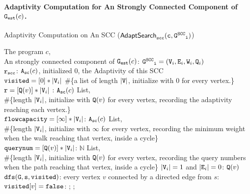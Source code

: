 \paragraph*{Adaptivity Computation for An Strongly Connected Component of $\mathtt{{G_{est}}}(c)$.}
\begin{algorithm}
 \caption{
 {Adaptivity Computation on An SCC ({$\mathtt{\mathsf{AdaptSearch}_{scc}(c, \mathtt{G^{SCC}}_i)}$})}
 \label{alg:adaptscc}
 }
 \begin{algorithmic}[1]
 \REQUIRE 
 The program $c$, 
 \\ \qquad
 An strongly connected component of $\mathtt{{G_{est}}}(c)$: 
 $ \mathtt{\mathtt{G^{SCC}}_i} = (\mathtt{V}_i, \mathtt{E}_i, \mathtt{W}_i, \mathtt{Q}_i)$
 \\
 $\mathtt{r_{scc}}$: ${\mathtt{A_{sc}}}(c)$, initialized $0$, the Adaptivity of this SCC
 \STATE {} 
 \\ \qquad $\mathtt{visited} = [0]*|\mathtt{V}_i|$ \#\{a list of length $|\mathtt{V}|$, initialize with $0$ for every vertex.\}
 \\ \qquad $\mathtt{r} = [\mathtt{Q}(v)]* |\mathtt{V}_i|$ : ${\mathtt{A_{sc}}}(c)$ List, 
 \\ \qquad \#\{length $|\mathtt{V}_i|$, initialize with $\mathtt{Q}(v)$ for every vertex, recording the adaptivity reaching each vertex.\}
 \\ \qquad $\mathtt{flowcapacity} = [\infty]* |\mathtt{V}_i|$: ${\mathtt{A_{sc}}}(c)$ List, 
 \\ \qquad \#\{length $|\mathtt{V}_i|$, initialize with $\infty$ for every vertex,
 recording the minimum weight when the walk reaching 
 that vertex, inside a cycle\}
 \\ \qquad $\mathtt{querynum} = [\mathtt{Q}(v)]* |\mathtt{V}_i|$: $\mathbb{N}$ List,
 \\ \qquad \#\{length $|\mathtt{V}_i|$, initialize with $\mathtt{Q}(v)$ for every vertex, 
 recording the query numbers when the path reaching 
 that vertex, inside a cycle\}
  $|\mathtt{V}_i| = 1$ and $|\mathtt{E}_i| = 0$:
 \STATE {} $\mathtt{Q}(v)$
  {$\mathtt{dfs(G,s,visited)}$}:
 \STATE {} every vertex $v$ 
 connected by a directed edge from $s$:
 \STATE \qquad {} $\mathtt{visited}[v] = \mathtt{false}$:
 \STATE \qquad \qquad {};
 \STATE \qquad \qquad {};

\end{algorithmic}
\end{algorithm}
